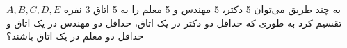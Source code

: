 \p    
به چند طریق می‌توان 5 دکتر، 5 مهندس و 5 معلم را به 5 اتاق 3 نفره
$A,B,C,D,E$
تقسیم کرد به طوری که
حداقل دو دکتر در یک اتاق، حداقل دو مهندس در یک اتاق و حداقل دو معلم در یک اتاق باشند؟
